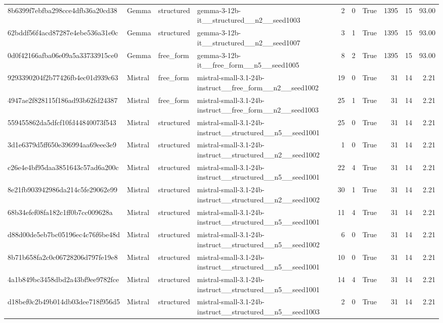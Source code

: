 \begin{longtable}{llllrrrrrr}
8b6399f7ebfba298cce4dfb36a20cd38 & Gemma & structured & gemma-3-12b-it\_\_structured\_\_n2\_\_seed1003 & 2 & 0 & True & 1395 & 15 & 93.00 \\
62bddf56f4acd87287e4ebe536a31e0c & Gemma & structured & gemma-3-12b-it\_\_structured\_\_n2\_\_seed1007 & 3 & 1 & True & 1395 & 15 & 93.00 \\
0d0f42166afba06e09a5a33733915ce0 & Gemma & free\_form & gemma-3-12b-it\_\_free\_form\_\_n5\_\_seed1005 & 8 & 2 & True & 1395 & 15 & 93.00 \\
9293390204f2b77426fb4ec01d939c63 & Mistral & free\_form & mistral-small-3.1-24b-instruct\_\_free\_form\_\_n2\_\_seed1002 & 19 & 0 & True & 31 & 14 & 2.21 \\
4947ae2f828115f186ad93b62fd24387 & Mistral & free\_form & mistral-small-3.1-24b-instruct\_\_free\_form\_\_n2\_\_seed1003 & 25 & 1 & True & 31 & 14 & 2.21 \\
559455862da5dfcf10fd44840073f543 & Mistral & structured & mistral-small-3.1-24b-instruct\_\_structured\_\_n5\_\_seed1001 & 25 & 0 & True & 31 & 14 & 2.21 \\
3d1e6379d5ff650e396994aa69eee3e9 & Mistral & structured & mistral-small-3.1-24b-instruct\_\_structured\_\_n2\_\_seed1002 & 1 & 0 & True & 31 & 14 & 2.21 \\
c26e4e4bf95daa3851643c57ad6a200c & Mistral & structured & mistral-small-3.1-24b-instruct\_\_structured\_\_n5\_\_seed1001 & 22 & 4 & True & 31 & 14 & 2.21 \\
8e21fb903942986da214c5fe29062e99 & Mistral & structured & mistral-small-3.1-24b-instruct\_\_structured\_\_n2\_\_seed1002 & 30 & 1 & True & 31 & 14 & 2.21 \\
68b34efef08fa182c1ff0b7cc009628a & Mistral & structured & mistral-small-3.1-24b-instruct\_\_structured\_\_n5\_\_seed1001 & 11 & 4 & True & 31 & 14 & 2.21 \\
d88d00de5eb7bc05196ec4c76f6be48d & Mistral & structured & mistral-small-3.1-24b-instruct\_\_structured\_\_n5\_\_seed1002 & 6 & 0 & True & 31 & 14 & 2.21 \\
8b71b658fa2c0c06728206d797fe19e8 & Mistral & structured & mistral-small-3.1-24b-instruct\_\_structured\_\_n5\_\_seed1001 & 10 & 0 & True & 31 & 14 & 2.21 \\
4a1b849bc3458dbd2a43bf9ee9782fce & Mistral & structured & mistral-small-3.1-24b-instruct\_\_structured\_\_n5\_\_seed1001 & 14 & 4 & True & 31 & 14 & 2.21 \\
d18bef0c2b49b014db03dee718f956d5 & Mistral & structured & mistral-small-3.1-24b-instruct\_\_structured\_\_n5\_\_seed1003 & 2 & 0 & True & 31 & 14 & 2.21 \\

\end{longtable}
